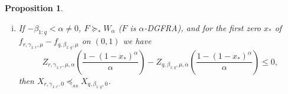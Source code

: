 \documentclass [11pt]{article}
\newtheorem{proposition}{Proposition}
\begin{document}
\begin{proposition}
\begin{enumerate}
\begin{enumerate}[(i)]
    \item
    If
    $-\beta_{1:q} < \alpha \neq 0$,
    $F \succeq_* W_\alpha$ ($F$ is $\alpha$-DGFRA), and for the first zero $x_*$ of $f_{r, \gamma_{1:r}, \mu} - f_{q,\beta_{1:q}, \mu}$ on $(0,1)$ we have
    \begin{equation*}
    \label{25p}
    Z_{r, \gamma_{1:r}, \mu, \alpha}\left(\frac{1-(1-x_*)^\alpha}{\alpha}
    \right)  -
    Z_{q, \beta_{1:q}, \mu, \alpha}\left(\frac{1-(1-x_*)^\alpha}{\alpha}
    \right)  \leq 0,
    \end{equation*}
    then $X_{r,\gamma_{1:r}, 0} \preceq_{ss} X_{q, \beta_{1:q},0}$.
    \end{enumerate}
\end{enumerate}
%
%

\end{proposition}
\end{document}
